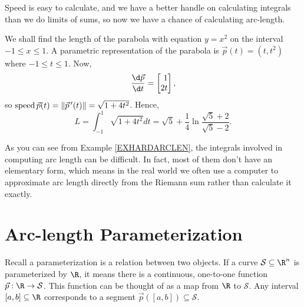 Speed is easy to calculate, and we have a better handle on calculating integrals than we do 
limits of sums, so now we have a chance of calculating arc-length.

\begin{example}
	\label{EXHARDARCLEN}
We shall find the length of the parabola with equation $y = x^2$
on the interval $-1\le x \le 1$.   A parametric representation
	of the parabola is $\vec p(t) = (t,t^2)$
where $-1 \le t \le 1$.  
Now,
\[
	\frac{\d\vec p}{\d t} = \mat{1\\2t},
\]
so $\operatorname{speed} \vec p(t)=\lVert\vec p\,'(t)\rVert = \sqrt{ 1 + 4t^2}$.
Hence,
\[
  L = \int_{-1}^1 \sqrt{1 + 4t^2} dt = \sqrt 5 + 
\frac 14\ln\frac{\sqrt 5 + 2}{\sqrt 5 - 2}.
\]
\end{example}

As you can see from Example \ref{EXHARDARCLEN}, the integrals involved in computing
arc length can be difficult.  In fact, most of them don't have an elementary form, which
means in the real world we often use a computer to approximate arc length directly from the Riemann sum
rather than calculate it exactly.

\begin{exercises}
\end{exercises}

\section{Arc-length Parameterization}

Recall a parameterization is a relation between two objects.  If a curve $\mathcal S\subseteq\R^n$
is parameterized by $\R$, it means there is a continuous, one-to-one function $\vec p:\R\to\mathcal S$.
This function can be thought of as a map from $\R$ to $\mathcal S$.  Any interval $[a,b]\subseteq\R$
corresponds to a segment $\vec p([a,b])\subseteq \mathcal S$.

